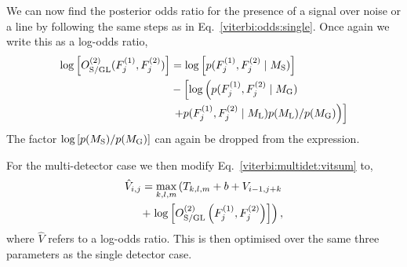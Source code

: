 %
We can now find the posterior odds ratio for the presence of a signal over noise or a line by following the same steps as in Eq.~\ref{viterbi:odds:single}. Once again we write this as a log-odds ratio,
\begin{equation}
\begin{split}
\label{viterbi:lineaware:logodds}
\log\left[ O^{(2)}_{\rm{S/GL}}(F^{(1)}_{j},F^{(2)}_{j})\right] &=  \log\left[ p(F^{(1)}_{j},F^{(2)}_{j} \mid M_{\rm{S}}) \right] \\
&- \left[ \log\left( p(F^{(1)}_{j},F^{(2)}_{j}\mid M_{\rm{G}}) \right. \right. \\
&\left.\left.+  p(F^{(1)}_{j},F^{(2)}_{j}\mid M_{\rm{L}})p(M_{\rm{L}})/p(M_{\rm{G}})\right) \right]
\end{split}
\end{equation}
The factor $\log\left[ p(M_{\rm{S}})/p(M_{\rm{G}})\right]$ can again be dropped from the expression.

For the multi-detector case we then modify Eq.~\ref{viterbi:multidet:vitsum} to,
\begin{equation}
\begin{split}
\label{viterbi:lineaware:stat:multi}
\hat{V}_{i,j} = \max_{k,l,m}\left(T_{k,l,m} + b + V_{i-1,j+k}   \right. \\
 + \left.  \log\left[O^{(2)}_{\rm{S/GL}}\left(F^{(1)}_{j},F^{(2)}_{j}\right)\right]\right),
\end{split}
\end{equation}
%
where $\hat{V}$ refers to a log-odds ratio.
This is then optimised over the same three parameters as the single detector case.

